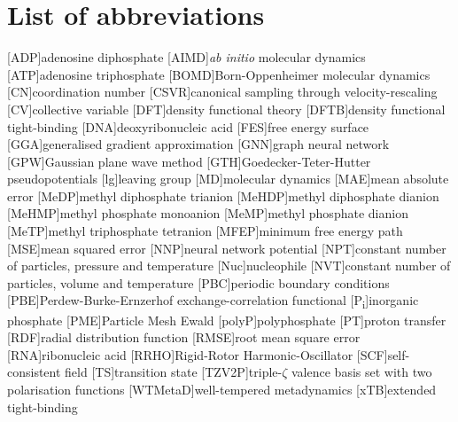 \chapter*{List of abbreviations}

\begin{acronym}
    [ADP]{adenosine diphosphate}
    [AIMD]{\textit{ab initio} molecular dynamics}
    [ATP]{adenosine triphosphate}
    [BOMD]{Born-Oppenheimer molecular dynamics}
    [CN]{coordination number}
    [CSVR]{canonical sampling through velocity-rescaling}
    [CV]{collective variable}
    [DFT]{density functional theory}
    [DFTB]{density functional tight-binding}
    [DNA]{deoxyribonucleic acid}
    [FES]{free energy surface}
    [GGA]{generalised gradient approximation}
    [GNN]{graph neural network}
    [GPW]{Gaussian plane wave method}
    [GTH]{Goedecker-Teter-Hutter pseudopotentials}
    [lg]{leaving group}
    [MD]{molecular dynamics}
    [MAE]{mean absolute error}
    [MeDP]{methyl diphosphate trianion}
    [MeHDP]{methyl diphosphate dianion}
    [MeHMP]{methyl phosphate monoanion}
    [MeMP]{methyl phosphate dianion}
    [MeTP]{methyl triphosphate tetranion}
    [MFEP]{minimum free energy path}
    [MSE]{mean squared error}
    [NNP]{neural network potential}
    [NPT]{constant number of particles, pressure and temperature}
    [Nuc]{nucleophile}
    [NVT]{constant number of particles, volume and temperature}
    [PBC]{periodic boundary conditions}
    [PBE]{Perdew-Burke-Ernzerhof exchange-correlation functional}
    [P\textsubscript{i}]{inorganic phosphate}
    [PME]{Particle Mesh Ewald}
    [polyP]{polyphosphate}
    [PT]{proton transfer}
    [RDF]{radial distribution function}
    [RMSE]{root mean square error}
    [RNA]{ribonucleic acid}
    [RRHO]{Rigid-Rotor Harmonic-Oscillator}
    [SCF]{self-consistent field}
    [TS]{transition state}
    [TZV2P]{triple-$\zeta$ valence basis set with two polarisation functions}
    [WTMetaD]{well-tempered metadynamics}
    [xTB]{extended tight-binding}
\end{acronym}